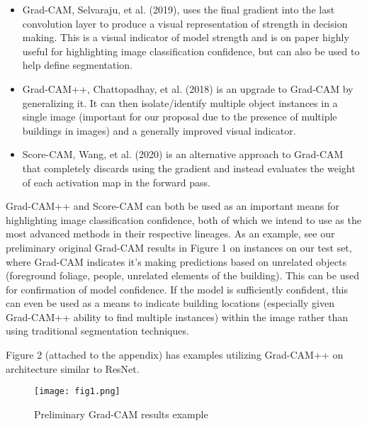 \documentclass{article}
\begin{document}
\begin{itemize} %
    \item Grad-CAM, Selvaraju, et al.\cite{selvaraju} (2019), uses the final gradient into the last convolution layer to produce a visual representation of strength in decision making. This is a visual indicator of model strength and is on paper highly useful for highlighting image classification confidence, but can also be used to help define segmentation. 
    \item Grad-CAM++, Chattopadhay, et al.\cite{chattopadhay} (2018) is an upgrade to Grad-CAM by generalizing it. It can then isolate/identify multiple object instances in a single image (important for our proposal due to the presence of multiple buildings in images) and a generally improved visual indicator. 
    \item Score-CAM, Wang, et al.\cite{wang} (2020) is an alternative approach to Grad-CAM that completely discards using the gradient and instead evaluates the weight of each activation map in the forward pass. 
\end{itemize}

Grad-CAM++ and Score-CAM can both be used as an important means for highlighting image classification confidence, both of which we intend to use as the most advanced methods in their respective lineages. As an example, see our preliminary original Grad-CAM results in Figure 1 on instances on our test set, where Grad-CAM indicates it's making predictions based on unrelated objects (foreground foliage, people, unrelated elements of the building). This can be used for confirmation of model confidence. If the model is sufficiently confident, this can even be used as a means to indicate building locations (especially given Grad-CAM++ ability to find multiple instances) within the image rather than using traditional segmentation techniques.

Figure 2 (attached to the appendix) has examples utilizing Grad-CAM++ on architecture similar to ResNet.

\begin{figure}[h]
    \centering
    \texttt{[image: fig1.png]}
    \caption{Preliminary Grad-CAM results example}
    \label{fig:prelim_results_1}
\end{figure}
\end{document}
